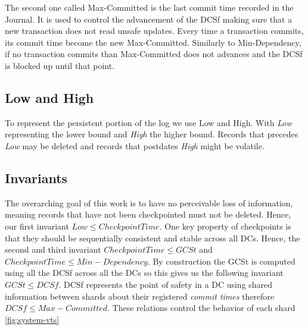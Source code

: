 \documentclass[twoside]{article}
\begin{document}
The second one called Max-Committed is the last commit time recorded in the
Journal.
It is used to control the advancement of the DCSf making sure that a new
transaction does not read unsafe updates.
Every time a transaction commits, its commit time become the new Max-Committed.
Similarly to Min-Dependency, if no transaction commits than Max-Committed does
not advances and the DCSf is blocked up until that point.

\subsection{Low and High}
\label{sec:low-high}
To represent the persistent portion of the log we use Low and High. 
With \emph{Low} representing the lower bound and \emph{High} the higher
bound.
Records that precedes \emph{Low} may be deleted and records that postdates
\emph{High} might be volatile.

\subsection{Invariants}
\label{sec:cuts-invariants}

The overarching goal of this work is to have no perceivable loss of information,
meaning records that have not been checkpointed must not be deleted.
Hence, our first invariant $\mathit{Low} \le \mathit{Checkpoint Time}$.
One key property of checkpoints is that they should be sequentially consistent
and stable across all DCs.
Hence, the second and third invariant $\mathit{Checkpoint Time} \le
\mathit{GCSt}$ and $\mathit{Checkpoint Time} \le \mathit{Min-Dependency}$.
By construction the GCSt is computed using all the DCSf across all the DCs so
this gives us the following invariant $\mathit{GCSt} \le
\mathit{DCSf}$. 
DCSf represents the point of safety in a DC using shared information between
shards about their registered \emph{commit times} therefore $\mathit{DCSf} \le
\mathit{Max-Committed}$. 
These relations control the behavior of each shard \ref{fig:system-vts}
\end{document}
